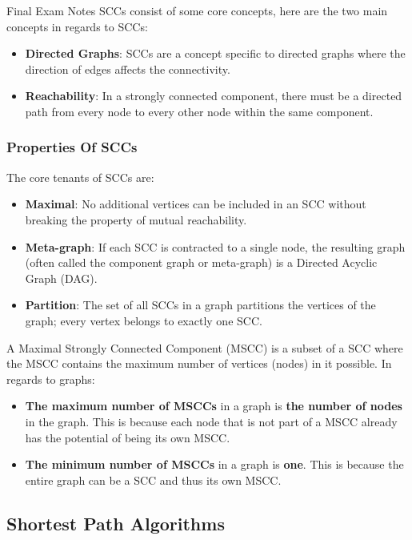 \begin{examnotes}{Final Exam Notes}
    SCCs consist of some core concepts, here are the two main concepts in regards to SCCs:

    \begin{itemize}
        \item \textbf{Directed Graphs}: SCCs are a concept specific to directed graphs where the direction of edges affects the connectivity.
        \item \textbf{Reachability}: In a strongly connected component, there must be a directed path from every node to every other node within the same component.
    \end{itemize}

    \subsubsection*{Properties Of SCCs}

    The core tenants of SCCs are:

    \begin{itemize}
        \item \textbf{Maximal}: No additional vertices can be included in an SCC without breaking the property of mutual reachability.
        \item \textbf{Meta-graph}: If each SCC is contracted to a single node, the resulting graph (often called the component graph or meta-graph) is a Directed Acyclic Graph (DAG).
        \item \textbf{Partition}: The set of all SCCs in a graph partitions the vertices of the graph; every vertex belongs to exactly one SCC.
    \end{itemize}
    A Maximal Strongly Connected Component (MSCC) is a subset of a SCC where the MSCC contains the maximum number of vertices (nodes) in it possible. In regards to graphs:

    \begin{itemize}
        \item \textbf{The maximum number of MSCCs} in a graph is \textbf{the number of nodes} in the graph. This is because each node that is not part of a MSCC already has the potential of being its own MSCC.
        \item \textbf{The minimum number of MSCCs} in a graph is \textbf{one}. This is because the entire graph can be a SCC and thus its own MSCC.
    \end{itemize}

    \subsection*{Shortest Path Algorithms}


\end{examnotes}

